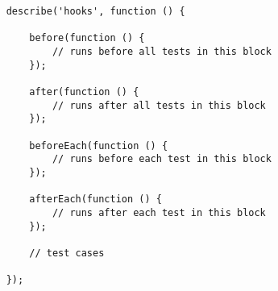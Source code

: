 
\begin{lstlisting}
	describe('hooks', function () {

		before(function () {
			// runs before all tests in this block
		});

		after(function () {
			// runs after all tests in this block
		});

		beforeEach(function () {
			// runs before each test in this block
		});

		afterEach(function () {
			// runs after each test in this block
		});

		// test cases

	});
\end{lstlisting}

